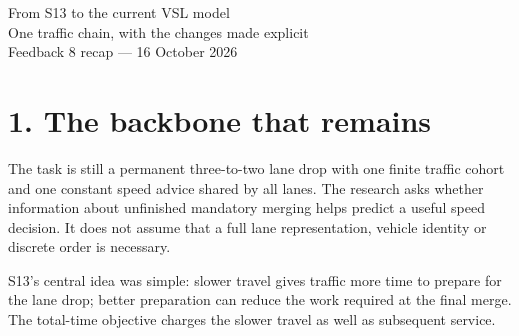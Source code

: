 \documentclass[11pt,a4paper]{article}
\begin{document}
\begin{center}
{\LARGE From S13 to the current VSL model}\\[5pt]
{\large One traffic chain, with the changes made explicit}\\[5pt]
Feedback 8 recap --- 16 October 2026
\end{center}

\section*{1. The backbone that remains}
The task is still a permanent three-to-two lane drop with one finite traffic
cohort and one constant speed advice shared by all lanes. The research asks
whether information about unfinished mandatory merging helps predict a useful
speed decision. It does not assume that a full lane representation, vehicle
identity or discrete order is necessary.

S13's central idea was simple: slower travel gives traffic more time to
prepare for the lane drop; better preparation can reduce the work required
at the final merge. The total-time objective charges the slower travel as
well as subsequent service.
\end{document}

